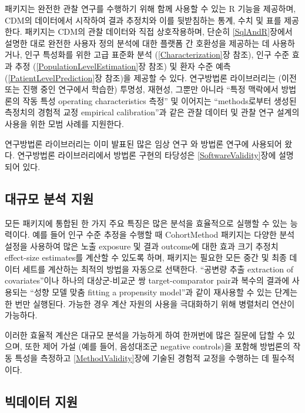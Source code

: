 \documentclass[10.5pt]{book}
\theoremstyle{definition}
\theoremstyle{definition}
\theoremstyle{definition}
\theoremstyle{remark}
\begin{document}
패키지는 완전한 관찰 연구를 수행하기 위해 함께 사용할 수 있는 R 기능을
제공하며, CDM의 데이터에서 시작하여 결과 추정치와 이를 뒷받침하는 통계,
수치 및 표를 제공한다. 패키지는 CDM의 관찰 데이터와 직접 상호작용하며,
단순히 \ref{SqlAndR}장에서 설명한 대로 완전한 사용자 정의 분석에 대한
플랫폼 간 호환성을 제공하는 데 사용하거나, 인구 특성화를 위한 고급
표준화 분석 (\ref{Characterization}장 참조), 인구 수준 효과 추정
(\ref{PopulationLevelEstimation}장 참조) 및 환자 수준 예측
(\ref{PatientLevelPrediction}장 참조)을 제공할 수 있다. 연구방법론
라이브러리는 (이전 또는 진행 중인 연구에서 학습한) 투명성, 재현성,
그뿐만 아니라 ``특정 맥락에서 방법론의 작동 특성 operating
characteristics 측정'' 및 이어지는 ``methods로부터 생성된 측정치의
경험적 교정 empirical calibration''과 같은 관찰 데이터 및 관찰 연구
설계의 사용을 위한 모범 사례를 지원한다.

연구방법론 라이브러리는 이미 발표된 많은 임상 연구
\citep{boland_2017, duke_2017, ramcharran_2017, weinstein_2017, wang_2017, ryan_2017, ryan_2018, vashisht_2018, yuan_2018, johnston_2019}와
방법론 연구에 사용되어 왔다.
\citep{schuemie_2014, schuemie_2016, reps2018, tian_2018, schuemie_2018, schuemie_2018b, reps_2019}
연구방법론 라이브러리에서 방법론 구현의 타당성은
\ref{SoftwareValidity}장에 설명되어 있다.

\subsection{대규모 분석 지원}\label{--}

모든 패키지에 통합된 한 가지 주요 특징은 많은 분석을 효율적으로 실행할
수 있는 능력이다. 예를 들어 인구 수준 추정을 수행할 때 CohortMethod
패키지는 다양한 분석 설정을 사용하여 많은 노출 exposure 및 결과
outcome에 대한 효과 크기 추정치 effect-size estimates를 계산할 수 있도록
하며, 패키지는 필요한 모든 중간 및 최종 데이터 세트를 계산하는 최적의
방법을 자동으로 선택한다. ``공변량 추출 extraction of covariates''이나
하나의 대상군-비교군 쌍 target-comparator pair과 복수의 결과에 사용되는
``성향 모델 맞춤 fitting a propensity model''과 같이 재사용할 수 있는
단계는 한 번만 실행된다. 가능한 경우 계산 자원의 사용을 극대화하기 위해
병렬처리 연산이 가능하다.

이러한 효율적 계산은 대규모 분석을 가능하게 하여 한꺼번에 많은 질문에
답할 수 있으며, 또한 제어 가설 (예를 들어, 음성대조군 negative
controls)을 포함해 방법론의 작동 특성을 측정하고
\ref{MethodValidity}장에 기술된 경험적 교정을 수행하는 데 필수적이다.

\subsection{빅데이터 지원}\label{BigDataSupport}
\end{document}
